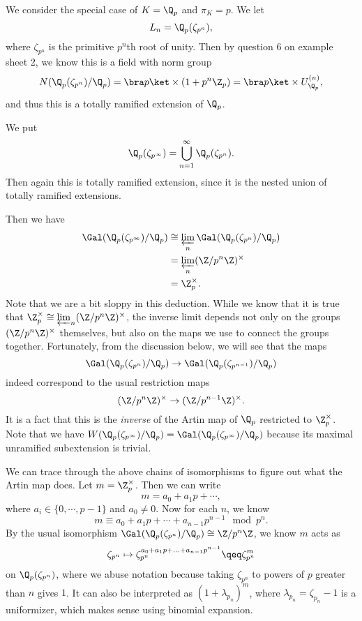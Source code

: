 \documentclass[a4paper]{article}
\begin{document}
\begin{eg}
  We consider the special case of $K = \Q_p$ and $\pi_K = p$. We let
  \[
    L_n = \Q_p (\zeta_{p^n}),
  \]
  where $\zeta_{p^n}$ is the primitive $p^n$th root of unity. Then by question 6 on example sheet 2, we know this is a field with norm group
  \[
    N(\Q_p(\zeta_{p^n})/\Q_p) = \bra p\ket \times(1 + p^n\Z_p) = \bra p \ket \times U_{\Q_p}^{(n)},
  \]
  and thus this is a totally ramified extension of $\Q_p$.

  We put
  \[
    \Q_p(\zeta_{p^\infty}) = \bigcup_{n = 1}^\infty \Q_p(\zeta_{p^n}).
  \]
  Then again this is totally ramified extension, since it is the nested union of totally ramified extensions.

  Then we have
  \begin{align*}
    \Gal(\Q_p(\zeta_{p^\infty})/\Q_p) &\cong \varprojlim_n \Gal(\Q_p(\zeta_{p^n})/\Q_p)\\
    &= \varprojlim_n (\Z/p^n \Z)^\times \\
    &= \Z_p^\times.
  \end{align*}
  Note that we are a bit sloppy in this deduction. While we know that it is true that $\Z_p^\times \cong \varprojlim_n (\Z/p^n\Z)^\times$, the inverse limit depends not only on the groups $(\Z/p^n\Z)^\times$ themselves, but also on the maps we use to connect the groups together. Fortunately, from the discussion below, we will see that the maps
  \[
    \Gal(\Q_p(\zeta_{p^n})/\Q_p) \to \Gal(\Q_p(\zeta_{p^{n - 1}})/\Q_p)
  \]
  indeed correspond to the usual restriction maps
  \[
    (\Z/p^n \Z)^\times \to (\Z/p^{n - 1}\Z)^\times.
  \]
  It is a fact that this is the \emph{inverse} of the Artin map of $\Q_p$ restricted to $\Z_p^\times$. Note that we have $W(\Q_p(\zeta_{p^\infty})/\Q_p) = \Gal(\Q_p(\zeta_{p^\infty})/\Q_p)$ because its maximal unramified subextension is trivial.

  We can trace through the above chains of isomorphisms to figure out what the Artin map does. Let $m = \Z_p^\times$. Then we can write
  \[
    m = a_0 + a_1p + \cdots,
  \]
  where $a_i \in \{0, \cdots, p - 1\}$ and $a_0 \not= 0$. Now for each $n$, we know
  \[
    m \equiv a_0 + a_1 p + \cdots + a_{n - 1}p^{n - 1} \mod p^n.
  \]
  By the usual isomorphism $\Gal(\Q_p(\zeta_{p^n})/\Q_p) \cong \Z/p^n\Z$, we know $m$ acts as
  \[
    \zeta_{p^n} \mapsto \zeta_{p^n}^{a_0 + a_1 p + \ldots + a_{n - 1} p^{n - 1}} \qeq \zeta_{p^n}^m
  \]
  on $\Q_p(\zeta_{p^n})$, where we abuse notation because taking $\zeta_{p^n}$ to powers of $p$ greater than $n$ gives $1$. It can also be interpreted as $(1+\lambda_{p_n})^m$, where $\lambda_{p_n}=\zeta_{p_n}-1$ is a uniformizer, which makes sense using binomial expansion.


\end{eg}
\end{document}
